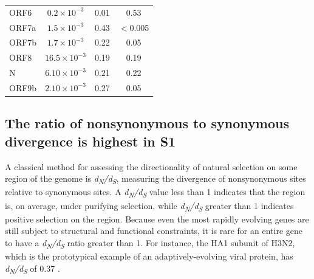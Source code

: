 \documentclass[11pt,oneside,letterpaper]{article}
\begin{document}
\begin{table}[]
\begin{center}
\begin{tabular}{lccc}
    ORF6  & $0.2 \times 10^{-3}$  & 0.01   & 0.53     \\
    ORF7a & $1.5 \times 10^{-3}$  & 0.43   & $<$0.005 \\
    ORF7b & $1.7 \times 10^{-3}$  & 0.22   & 0.05     \\
    ORF8  & $16.5 \times 10^{-3}$ & 0.19   & 0.19     \\
    N     & $6.10 \times 10^{-3}$ & 0.21   & 0.22     \\
    ORF9b & $2.10 \times 10^{-3}$ & 0.27   & 0.05     \\
    \hline
    \end{tabular}
    \label{tab:table1}
    \end{center}
\end{table}

\subsection*{The ratio of nonsynonymous to synonymous divergence is highest in S1}
A classical method for assessing the directionality of natural selection on some region of the genome is \emph{d\textsubscript{N}/d\textsubscript{S}}, measuring the divergence of nonsynonymous sites relative to synonymous sites. 
A \emph{d\textsubscript{N}/d\textsubscript{S}} value less than 1 indicates that the region is, on average, under purifying selection, while \emph{d\textsubscript{N}/d\textsubscript{S}} greater than 1 indicates positive selection on the region. 
Because even the most rapidly evolving genes are still subject to structural and functional constraints, it is rare for an entire gene to have a \emph{d\textsubscript{N}/d\textsubscript{S}} ratio greater than 1. 
For instance, the HA1 subunit of H3N2, which is the prototypical example of an adaptively-evolving viral protein, has \emph{d\textsubscript{N}/d\textsubscript{S}} of 0.37 \cite{Wolf2006-vy}.
\end{document}
